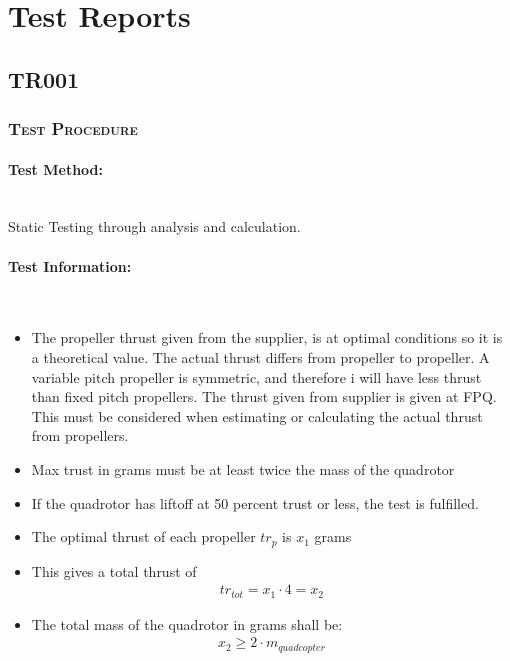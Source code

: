 \section{Test Reports}
\subsection{TR001}
   {}
\subsubsection{\textsc{\medium Test Procedure}}

\paragraph{Test Method:}\mbox{}\\
Static Testing through analysis and calculation.

\paragraph{Test Information:}\mbox{}\\
\begin{itemize}
\item  The propeller thrust given from the supplier, is at optimal conditions so it is a theoretical value. The actual thrust differs from propeller to propeller. A variable pitch propeller is symmetric, and therefore i will have less thrust than fixed pitch propellers. The thrust given from supplier is given at FPQ. This must be considered when estimating or calculating the actual thrust from propellers.
\item Max trust in grams must be at least twice the mass of the quadrotor
\item If the quadrotor has liftoff at 50 percent trust or less, the test is fulfilled.
\item The optimal thrust of each propeller $tr_p$ is $x_1$ grams
\item This gives a total thrust of
    \begin{equation}
    \begin{split}
        tr_{tot} = x_1\cdot4 = x_2
    \end{split}
    \end{equation}
\item The total mass of the quadrotor in  grams shall be:
    \begin{equation}
    \begin{split}
        x_2 \geq 2\cdot m_{quadcopter} 
    \end{split}
    \end{equation}
\end{itemize}
